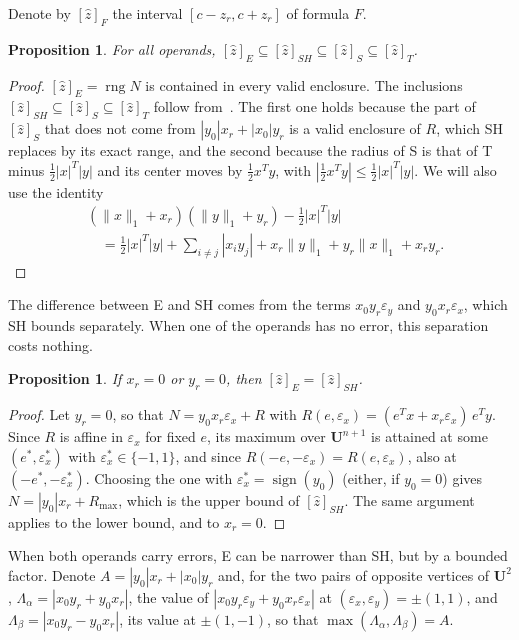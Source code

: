 \documentclass[10pt]{article}
\newtheorem{propo}[theorem]{Proposition}
\theoremstyle{definition}
\newcommand{\U}{\mathbf{U}}
\newcommand{\eps}{\varepsilon}
\newcommand{\ex}{\eps_x}
\newcommand{\ey}{\eps_y}
\newcommand{\rng}{\operatorname{rng}}
\begin{document}
Denote by $[\hat z]_F$ the interval $[c-z_r,c+z_r]$ of formula $F$.

\begin{propo}
\label{prop:chain}
For all operands, $[\hat z]_E \subseteq [\hat z]_{SH}\subseteq[\hat z]_S\subseteq[\hat z]_T$.
\end{propo}
\begin{proof}
$[\hat z]_E=\rng N$ is contained in every valid enclosure. The inclusions $[\hat z]_{SH}\subseteq[\hat z]_S\subseteq[\hat z]_T$ follow from~\cite[Prop.~3]{skalna2017new}. The first one holds because the part of $[\hat z]_S$ that does not come from $|y_0|x_r+|x_0|y_r$ is a valid enclosure of $R$, which SH replaces by its exact range, and the second because the radius of S is that of T minus $\tfrac12|x|^T|y|$ and its center moves by $\tfrac12x^Ty$, with $|\tfrac12x^Ty|\le\tfrac12|x|^T|y|$. We will also use the identity
\[
\begin{aligned}&(\|x\|_1+x_r)(\|y\|_1+y_r) - \tfrac12|x|^T|y|\\ &\quad= \tfrac12|x|^T|y|+\sum_{i\ne j}|x_iy_j| + x_r\|y\|_1+y_r\|x\|_1+x_ry_r .\end{aligned}
\]
\end{proof}

The difference between E and SH comes from the terms $x_0y_r\ey$ and $y_0x_r\ex$, which SH bounds separately. When one of the operands has no error, this separation costs nothing.

\begin{propo}
\label{prop:oneerror}
If $x_r=0$ or $y_r=0$, then $[\hat z]_E=[\hat z]_{SH}$.
\end{propo}
\begin{proof}
Let $y_r=0$, so that $N = y_0x_r\ex + R$ with $R(e,\ex)=(e^Tx+x_r\ex)\,e^Ty$. Since $R$ is affine in $\ex$ for fixed $e$, its maximum over $\U^{n+1}$ is attained at some $(e^*,\ex^*)$ with $\ex^*\in\{-1,1\}$, and since $R(-e,-\ex)=R(e,\ex)$, also at $(-e^*,-\ex^*)$. Choosing the one with $\ex^*=\operatorname{sign}(y_0)$ (either, if $y_0=0$) gives $N = |y_0|x_r + R_{\max}$, which is the upper bound of $[\hat z]_{SH}$. The same argument applies to the lower bound, and to $x_r=0$.
\end{proof}

When both operands carry errors, E can be narrower than SH, but by a bounded factor. Denote $A=|y_0|x_r+|x_0|y_r$ and, for the two pairs of opposite vertices of $\U^2$, $\Lambda_\alpha=|x_0y_r+y_0x_r|$, the value of $|x_0y_r\ey+y_0x_r\ex|$ at $(\ex,\ey)=\pm(1,1)$, and $\Lambda_\beta=|x_0y_r-y_0x_r|$, its value at $\pm(1,-1)$, so that $\max(\Lambda_\alpha,\Lambda_\beta)=A$.
\end{document}
